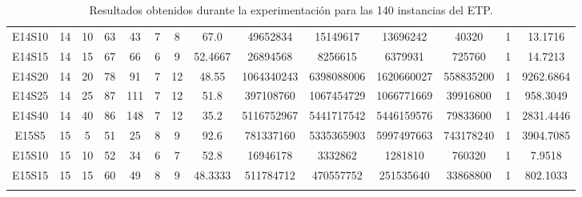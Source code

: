 \documentclass[letter, 10pt]{article}
\begin{document}
\begin{landscape}
\begin{longtable}{|c|c|c|c|c|c|c|c|c|c|c|c|c|c|}
E14S10 & 14 & 10 & 63 & 43 & 7 & 8 & 67.0 & 49652834 & 15149617 & 13696242 & 40320 & 1 & 13.1716 \\
E14S15 & 14 & 15 & 67 & 66 & 6 & 9 & 52.4667 & 26894568 & 8256615 & 6379931 & 725760 & 1 & 14.7213 \\
E14S20 & 14 & 20 & 78 & 91 & 7 & 12 & 48.55 & 1064340243 & 6398088006 & 1620660027 & 558835200 & 1 & 9262.6864 \\
E14S25 & 14 & 25 & 87 & 111 & 7 & 12 & 51.8 & 397108760 & 1067454729 & 1066771669 & 39916800 & 1 & 958.3049 \\
E14S40 & 14 & 40 & 86 & 148 & 7 & 12 & 35.2 & 5116752967 & 5441717542 & 5446159576 & 79833600 & 1 & 2831.4446 \\
E15S5 & 15 & 5 & 51 & 25 & 8 & 9 & 92.6 & 781337160 & 5335365903 & 5997497663 & 743178240 & 1 & 3904.7085 \\
E15S10 & 15 & 10 & 52 & 34 & 6 & 7 & 52.8 & 16946178 & 3332862 & 1281810 & 760320 & 1 & 7.9518 \\
E15S15 & 15 & 15 & 60 & 49 & 8 & 9 & 48.3333 & 511784712 & 470557752 & 251535640 & 33868800 & 1 & 802.1033 \\
\caption{Resultados obtenidos durante la experimentación para las 140 instancias del ETP.}
\label{tab:my-table}
\end{longtable}
\end{landscape}
\end{document}
